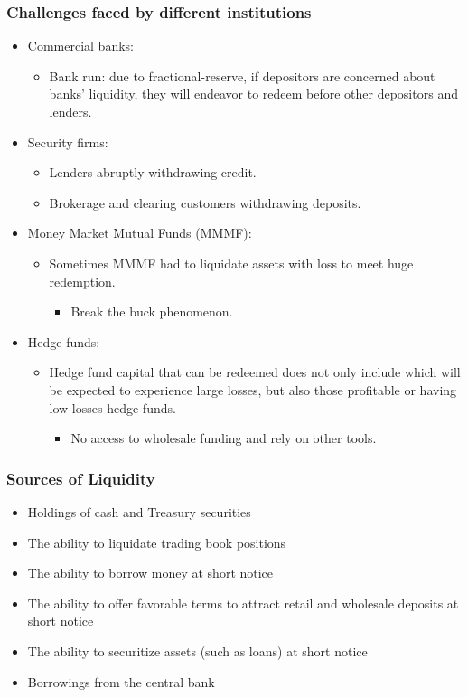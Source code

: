 \subsubsection{Challenges faced by different institutions}
\begin{itemize}
\item Commercial banks:
    \begin{itemize}
    \item Bank run: due to fractional-reserve, if depositors are concerned about banks' liquidity, they will endeavor to redeem before other depositors and lenders.
    \end{itemize}
\item Security firms:
    \begin{itemize}
    \item Lenders abruptly withdrawing credit.
    \item Brokerage and clearing customers withdrawing deposits.
    \end{itemize}
\item Money Market Mutual Funds (MMMF):
    \begin{itemize}
    \item Sometimes MMMF had to liquidate assets with loss to meet huge redemption.
        \begin{itemize}
        \item Break the buck phenomenon.
        \end{itemize}
    \end{itemize}
\item Hedge funds:
    \begin{itemize}
    \item Hedge fund capital that can be redeemed does not only include which will be expected to experience large losses, but also those profitable or having low losses hedge funds.
        \begin{itemize}
        \item No access to wholesale funding and rely on other tools.
        \end{itemize}
    \end{itemize}
\end{itemize}



\subsubsection{Sources of Liquidity}
\begin{itemize}
    \item Holdings of cash and Treasury securities
    \item The ability to liquidate trading book positions
    \item The ability to borrow money at short notice
    \item The ability to offer favorable terms to attract retail and wholesale deposits at short notice
    \item The ability to securitize assets (such as loans) at short notice
    \item Borrowings from the central bank
\end{itemize}



